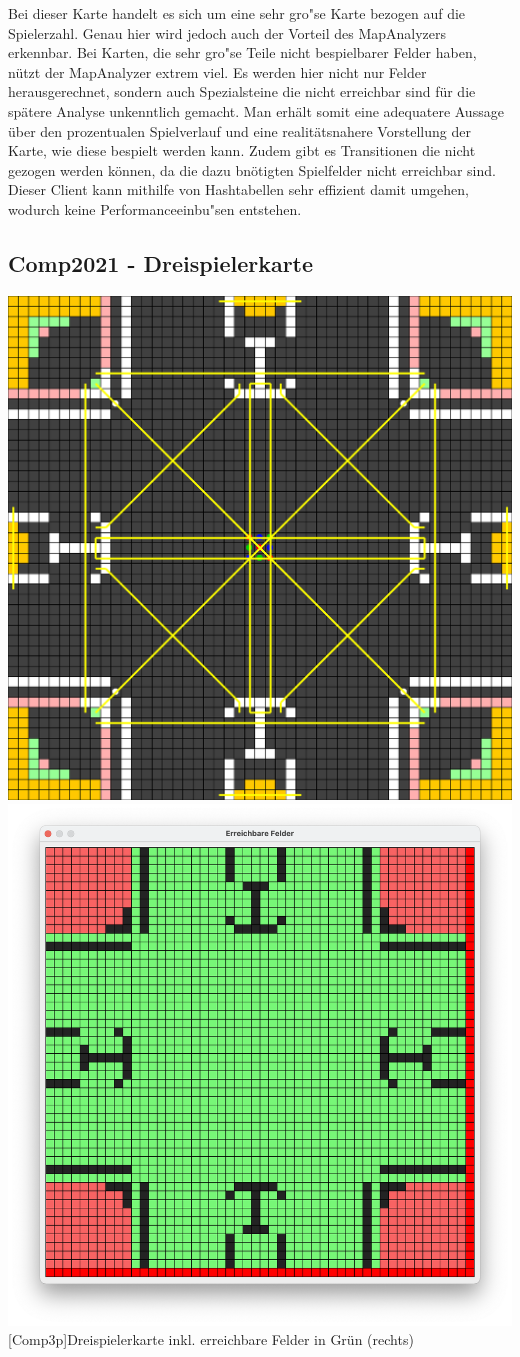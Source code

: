 Bei dieser Karte handelt es sich um eine sehr gro"se Karte bezogen auf die Spielerzahl.
Genau hier wird jedoch auch der Vorteil des MapAnalyzers erkennbar.
Bei Karten, die sehr gro"se Teile nicht bespielbarer Felder haben, n\"utzt der MapAnalyzer extrem viel.
Es werden hier nicht nur Felder herausgerechnet, sondern auch Spezialsteine die nicht erreichbar sind f\"ur die sp\"atere Analyse unkenntlich gemacht.
Man erh\"alt somit eine adequatere Aussage \"uber den prozentualen Spielverlauf und eine realit\"atsnahere Vorstellung der Karte, wie diese bespielt werden kann.
Zudem gibt es Transitionen die nicht gezogen werden k\"onnen, da die dazu bn\"otigten Spielfelder nicht erreichbar sind.
Dieser Client kann mithilfe von Hashtabellen sehr effizient damit umgehen, wodurch keine Performanceeinbu"sen entstehen.

\subsection{Comp2021 - Dreispielerkarte}\label{subsec:comp2021-3p}

\vspace{1em}
\begin{minipage}{\linewidth}
    \centering
    \includegraphics[width=0.49\linewidth]{pics/maps/comp2021_01_3p}
    \includegraphics[width=0.48\linewidth]{pics/maps/field2021_01_3p}
    [Comp3p]{Dreispielerkarte inkl. erreichbare Felder in Gr\"un (rechts)}
    \label{fig:comp-3p}
\end{minipage}
\vspace{1em}

